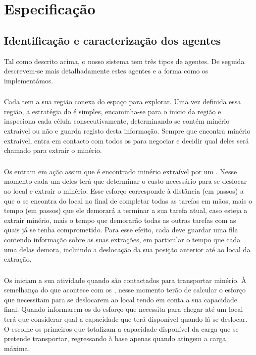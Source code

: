 \documentclass[12pt]{report}
\begin{document}
\chapter{Especificação}

\section{Identificação e caracterização dos agentes}

Tal como descrito acima, o nosso sistema tem três tipos de agentes. De seguida descrevem-se mais detalhadamente estes agentes e a forma como os implementámos.

\subsection{\Spotter}
Cada \spotter tem a sua região conexa do espaço para explorar. Uma vez definida essa região, a estratégia do \spotter é simples, encaminha-se para o inicio da região e inspeciona cada célula consecutivamente, determinando se contém minério extraível ou não e guarda registo desta informação. Sempre que encontra minério extraível, entra em contacto com todos os \producers para negociar e decidir qual deles será chamado para extrair o minério.

\subsection{\Producer}
Os \producers entram em ação assim que é encontrado minério extraível por um \spotter. Nesse momento cada um deles terá que determinar o custo necessário para se deslocar ao local e extrair o minério. Esse esforço corresponde à distância (em passos) a que o \producer se encontra do local no final de completar todas as tarefas em mãos, mais o tempo (em passos) que ele demorará a terminar a sua tarefa atual, caso esteja a extrair minério, mais o tempo que demorarão todas as outras tarefas com as quais já se tenha comprometido. Para esse efeito, cada \producer deve guardar uma fila contendo informação sobre as suas extrações, em particular o tempo que cada uma delas demora, incluindo a deslocação da sua posição anterior até ao local da extração.

\subsection{\Transporter}
Os \transporters iniciam a sua atividade quando são contactados para transportar minério. À semelhança do que acontece com os \producers, nesse momento terão de calcular o esforço que necessitam para se deslocarem ao local tendo em conta a sua capacidade final. Quando informarem os \producers do esforço que necessita para chegar até um local terá que considerar qual a capacidade que terá disponível quando lá se deslocar. O \producer escolhe os primeiros \transporters que totalizam a capacidade disponível da carga que se pretende transportar, regressando à base apenas quando atingem a carga máxima. 
\end{document}
